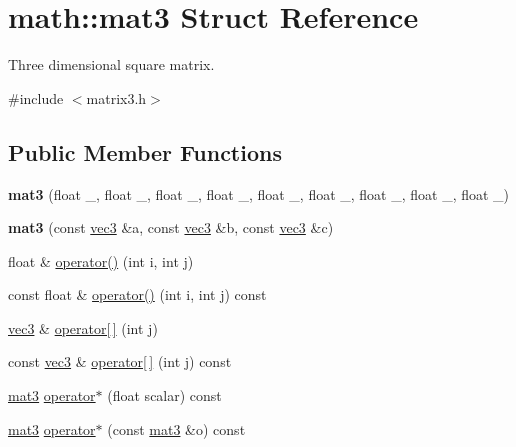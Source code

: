 \hypertarget{structmath_1_1mat3}{}\section{math\+:\+:mat3 Struct Reference}
\label{structmath_1_1mat3}


Three dimensional square matrix.  




{\ttfamily \#include $<$matrix3.\+h$>$}

\subsection*{Public Member Functions}
\begin{DoxyCompactItemize}
\item 
\mbox{\label{structmath_1_1mat3_ac55b962307f7719824ba6ffe374720c3}} 
{\bfseries mat3} (float \+\_, float \+\_, float \+\_, float \+\_, float \+\_, float \+\_, float \+\_, float \+\_, float \+\_)
\item 
\mbox{\label{structmath_1_1mat3_a56b2a802665b507847d72ab1bea75600}} 
{\bfseries mat3} (const \hyperlink{structmath_1_1vec3}{vec3} \&a, const \hyperlink{structmath_1_1vec3}{vec3} \&b, const \hyperlink{structmath_1_1vec3}{vec3} \&c)
\item 
float \& \hyperlink{structmath_1_1mat3_a3eebeb880c3004739ddeba140795a251}{operator()} (int i, int j)
\item 
const float \& \hyperlink{structmath_1_1mat3_af4211016916b51064cb63ca8154556cb}{operator()} (int i, int j) const
\item 
\hyperlink{structmath_1_1vec3}{vec3} \& \hyperlink{structmath_1_1mat3_a0e79a421b93c08169b6df3961426825e}{operator\mbox{[}$\,$\mbox{]}} (int j)
\item 
const \hyperlink{structmath_1_1vec3}{vec3} \& \hyperlink{structmath_1_1mat3_ace87c667cada9740a99e70c7f7181c3b}{operator\mbox{[}$\,$\mbox{]}} (int j) const
\item 
\hyperlink{structmath_1_1mat3}{mat3} \hyperlink{structmath_1_1mat3_a91f1b69ebda27ee6865e0b1ea5c6c6fb}{operator$\ast$} (float scalar) const
\item 
\hyperlink{structmath_1_1mat3}{mat3} \hyperlink{structmath_1_1mat3_ac2b79520ded1348a8daaa11cada2a633}{operator$\ast$} (const \hyperlink{structmath_1_1mat3}{mat3} \&o) const
\item 

\end{DoxyCompactItemize}
